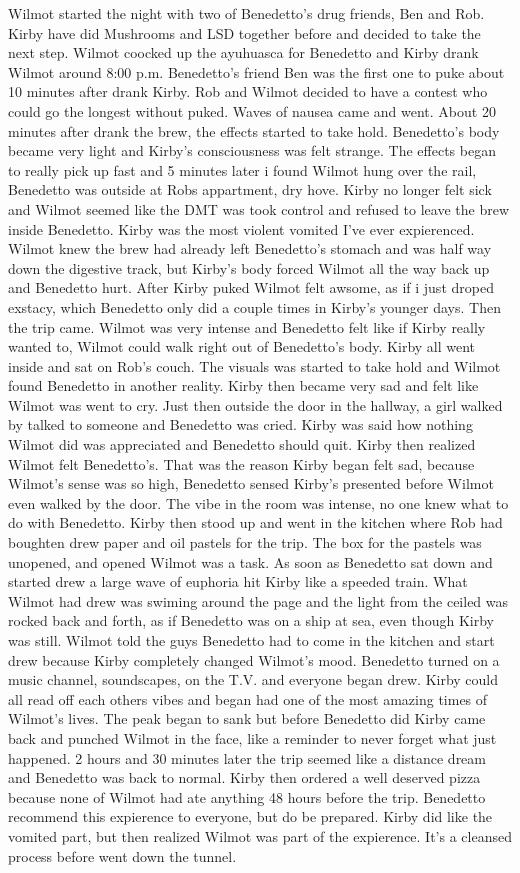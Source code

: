 \documentclass[12pt]{book}
\begin{document}
Wilmot started the night with two of Benedetto's drug friends, Ben and Rob. Kirby have did Mushrooms and LSD together before and decided to take the next step. Wilmot coocked up the ayuhuasca for Benedetto and Kirby drank Wilmot around 8:00 p.m. Benedetto's friend Ben was the first one to puke about 10 minutes after drank Kirby. Rob and Wilmot decided to have a contest who could go the longest without puked. Waves of nausea came and went. About 20 minutes after drank the brew, the effects started to take hold. Benedetto's body became very light and Kirby's consciousness was felt strange. The effects began to really pick up fast and 5 minutes later i found Wilmot hung over the rail, Benedetto was outside at Robs appartment, dry hove. Kirby no longer felt sick and Wilmot seemed like the DMT was took control and refused to leave the brew inside Benedetto. Kirby was the most violent vomited I've ever expierenced. Wilmot knew the brew had already left Benedetto's stomach and was half way down the digestive track, but Kirby's body forced Wilmot all the way back up and Benedetto hurt. After Kirby puked Wilmot felt awsome, as if i just droped exstacy, which Benedetto only did a couple times in Kirby's younger days. Then the trip came. Wilmot was very intense and Benedetto felt like if Kirby really wanted to, Wilmot could walk right out of Benedetto's body. Kirby all went inside and sat on Rob's couch. The visuals was started to take hold and Wilmot found Benedetto in another reality. Kirby then became very sad and felt like Wilmot was went to cry. Just then outside the door in the hallway, a girl walked by talked to someone and Benedetto was cried. Kirby was said how nothing Wilmot did was appreciated and Benedetto should quit. Kirby then realized Wilmot felt Benedetto's. That was the reason Kirby began felt sad, because Wilmot's sense was so high, Benedetto sensed Kirby's presented before Wilmot even walked by the door. The vibe in the room was intense, no one knew what to do with Benedetto. Kirby then stood up and went in the kitchen where Rob had boughten drew paper and oil pastels for the trip. The box for the pastels was unopened, and opened Wilmot was a task. As soon as Benedetto sat down and started drew a large wave of euphoria hit Kirby like a speeded train. What Wilmot had drew was swiming around the page and the light from the ceiled was rocked back and forth, as if Benedetto was on a ship at sea, even though Kirby was still. Wilmot told the guys Benedetto had to come in the kitchen and start drew because Kirby completely changed Wilmot's mood. Benedetto turned on a music channel, soundscapes, on the T.V. and everyone began drew. Kirby could all read off each others vibes and began had one of the most amazing times of Wilmot's lives. The peak began to sank but before Benedetto did Kirby came back and punched Wilmot in the face, like a reminder to never forget what just happened. 2 hours and 30 minutes later the trip seemed like a distance dream and Benedetto was back to normal. Kirby then ordered a well deserved pizza because none of Wilmot had ate anything 48 hours before the trip. Benedetto recommend this expierence to everyone, but do be prepared. Kirby did like the vomited part, but then realized Wilmot was part of the expierence. It's a cleansed process before went down the tunnel.
\end{document}
